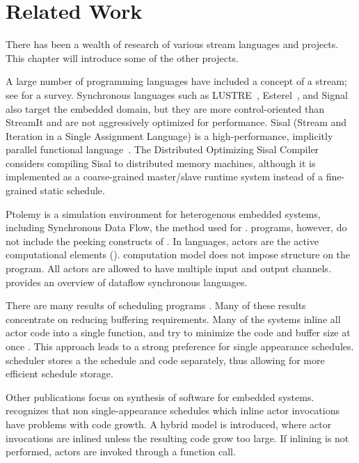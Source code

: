 \section{Related Work}

There has been a wealth of research of various stream languages
and projects.  This chapter will introduce some of the other
projects.

A large number of programming languages have included a concept of
a stream; see \cite{survey97} for a survey.  Synchronous languages
such as LUSTRE~\cite{lustre}, Esterel~\cite{esterel92}, and
Signal~\cite{signal} also target the embedded domain, but they are
more control-oriented than StreamIt and are not aggressively
optimized for performance.  Sisal (Stream and Iteration in a
Single Assignment Language) is a high-performance, implicitly
parallel functional language~\cite{sisal}.  The Distributed
Optimizing Sisal Compiler~\cite{sisal} considers compiling Sisal
to distributed memory machines, although it is implemented as a
coarse-grained master/slave runtime system instead of a
fine-grained static schedule.

Ptolemy \cite{ptolemyoverview} is a simulation environment for
heterogenous embedded systems, including Synchronous Data Flow,
the method used for {\StreamIt}. {\SDF} programs, however, do not
include the peeking constructs of {\StreamIt}.  In {\SDF} languages,
actors are the active computational elements ({\filters}).  {\SDF}
computation model does not impose structure on the program.  All
actors are allowed to have multiple input and output channels.
\cite{benveniste93dataflow} provides an overview of dataflow
synchronous languages.

There are many results of scheduling {\SDF} programs \cite{leesdf}.
Many of these results concentrate on reducing buffering
requirements. Many of the systems inline all actor code into a
single function, and try to minimize the code and buffer size at
once \cite{bhattacharyya99synthesis}.  This approach leads to a
strong preference for single appearance schedules.  {\StreamIt}
scheduler stores a the schedule and {\filter} code separately, thus
allowing for more efficient schedule storage.

Other publications focus on synthesis of software for embedded
systems. \cite{bhat1999x1} recognizes that non single-appearance
schedules which inline actor invocations have problems with code
growth.  A hybrid model is introduced, where actor invocations are
inlined unless the resulting code grow too large. If inlining is
not performed, actors are invoked through a function call.


